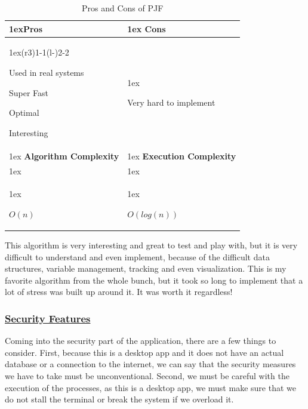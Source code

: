 \documentclass{article}
\begin{document}
\begin{table}[H]
  \begin{tabularx}{\linewidth}{>{\parskip1ex}X@{\kern4\tabcolsep}>{\parskip1ex}X}
    \toprule
    \hfil\bfseries Pros & \hfil\bfseries Cons \\
    \cmidrule(r{3\tabcolsep}){1-1}\cmidrule(l{-\tabcolsep}){2-2}

    Used in real systems\par
    Super Fast\par
    Optimal\par
    Interesting\par

    &

    Very hard to implement \\
    \bottomrule
    \toprule
    \hfil\bfseries Algorithm Complexity & \hfil\bfseries Execution Complexity \\

    \\
    \centerline{$O(n)$}\par

    &

    \centerline{$O(log(n))$}
  \end{tabularx}
  \caption{Pros and Cons of PJF}
\end{table}

This algorithm is very interesting and great to test and play with, but it is very difficult to understand and even implement, because of the difficult data structures, variable management, tracking and even visualization. This is my favorite algorithm from the whole bunch, but it took so long to implement that a lot of stress was built up around it. It was worth it regardless!

\subsubsection{\underline{Security Features}}

Coming into the security part of the application, there are a few things to consider. First, because this is a desktop app and it does not have an actual database or a connection to the internet, we can say that the security measures we have to take must be unconventional. Second, we must be careful with the execution of the processes, as this is a desktop app, we must make sure that we do not stall the terminal or break the system if we overload it.
\end{document}
